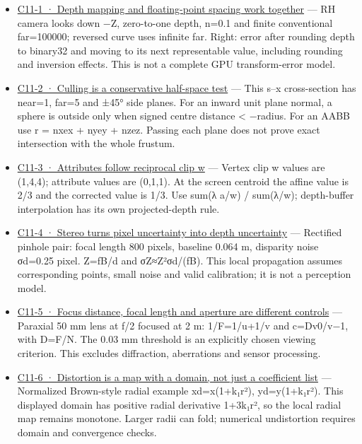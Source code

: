 \begin{itemize}
\item
  \hyperref[02-foundations-ii-ch033-figure-c11-1-depth-mapping-and-floating-point-spacing-work-together]{C11-1 · Depth mapping and floating-point spacing work together} --- RH camera looks down −Z, zero-to-one depth, n=0.1 and finite conventional far=100000; reversed curve uses infinite far. Right: error after rounding depth to binary32 and moving to its next representable value, including rounding and inversion effects. This is not a complete GPU transform-error model.
\item
  \hyperref[02-foundations-ii-ch034-figure-c11-2-culling-is-a-conservative-half-space-test]{C11-2 · Culling is a conservative half-space test} --- This s--x cross-section has near=1, far=5 and ±45° side planes. For an inward unit plane normal, a sphere is outside only when signed centre distance \textless{} −radius. For an AABB use r = \textbar nx\textbar ex + \textbar ny\textbar ey + \textbar nz\textbar ez. Passing each plane does not prove exact intersection with the whole frustum.
\item
  \hyperref[02-foundations-ii-ch034-figure-c11-3-attributes-follow-reciprocal-clip-w]{C11-3 · Attributes follow reciprocal clip w} --- Vertex clip w values are (1,4,4); attribute values are (0,1,1). At the screen centroid the affine value is 2/3 and the corrected value is 1/3. Use sum(λ a/w) / sum(λ/w); depth-buffer interpolation has its own projected-depth rule.
\item
  \hyperref[02-foundations-ii-ch035-figure-c11-4-stereo-turns-pixel-uncertainty-into-depth-uncertainty]{C11-4 · Stereo turns pixel uncertainty into depth uncertainty} --- Rectified pinhole pair: focal length 800 pixels, baseline 0.064 m, disparity noise σd=0.25 pixel. Z=fB/d and σZ≈Z²σd/(fB). This local propagation assumes corresponding points, small noise and valid calibration; it is not a perception model.
\item
  \hyperref[02-foundations-ii-ch036-figure-c11-5-focus-distance-focal-length-and-aperture-are-different-controls]{C11-5 · Focus distance, focal length and aperture are different controls} --- Paraxial 50 mm lens at f/2 focused at 2 m: 1/F=1/u+1/v and c=D\textbar v0/v−1\textbar, with D=F/N. The 0.03 mm threshold is an explicitly chosen viewing criterion. This excludes diffraction, aberrations and sensor processing.
\item
  \hyperref[02-foundations-ii-ch035-figure-c11-6-distortion-is-a-map-with-a-domain-not-just-a-coefficient-list]{C11-6 · Distortion is a map with a domain, not just a coefficient list} --- Normalized Brown-style radial example xd=x(1+k₁r²), yd=y(1+k₁r²). This displayed domain has positive radial derivative 1+3k₁r², so the local radial map remains monotone. Larger radii can fold; numerical undistortion requires domain and convergence checks.

\end{itemize}
